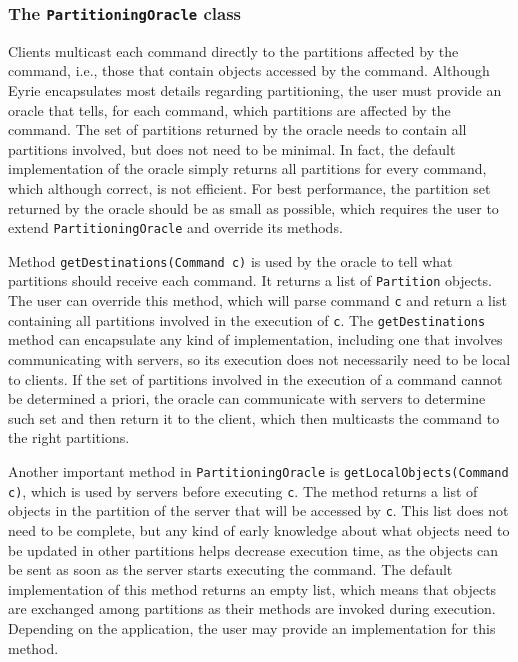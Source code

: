 \subsubsection{The \texttt{PartitioningOracle} class}

Clients multicast each command directly to the partitions affected by the command, i.e., those that contain objects accessed by the command. 
Although Eyrie encapsulates most details regarding partitioning, the user must provide an oracle that tells, for each command, which partitions are affected by the command. 
The set of partitions returned by the oracle needs to contain all partitions involved, but does not need to be minimal. 
In fact, the default implementation of the oracle simply returns all partitions for every command, which although correct, is not efficient. 
For best performance, the partition set returned by the oracle should be as small as possible, which requires the user to extend \verb#PartitioningOracle# and override its methods.

Method \verb#getDestinations(Command c)# is used by the oracle to tell what partitions should receive each command. It returns a list of \verb#Partition# objects. 
The user can override this method, which will parse command \verb#c# and return a list containing all partitions involved in the execution of \verb#c#. The \verb#getDestinations# method can encapsulate any kind of implementation, including one that involves communicating with servers, so its execution does not necessarily need to be local to clients. If the set of partitions involved in the execution of a command cannot be determined a priori, the oracle can communicate with servers to determine such set and then return it to the client, which then multicasts the command to the right partitions.

Another important method in \texttt{PartitioningOracle} is \verb#getLocalObjects(Command c)#\!, which is used by servers before executing \verb#c#.
The method returns a list of objects in the partition of the server that will be accessed by \verb#c#. 
This list does not need to be complete, but any kind of early knowledge about what objects need to be updated in other partitions helps decrease execution time, as the objects can be sent as soon as the server starts executing the command. The default implementation of this method returns an empty list, which means that objects are exchanged among partitions as their methods are invoked during execution. Depending on the application, the user may provide an implementation for this method.


